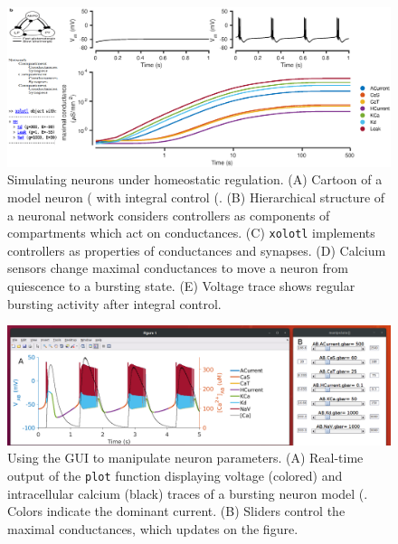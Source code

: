 \documentclass{frontiersSCNS} %
\begin{document}
\begin{figure}
	\centering
	\includegraphics[width=1.0\linewidth]{gfx/figure_integral_control}
	\caption{Simulating neurons under homeostatic regulation. (A) Cartoon of a model neuron (\cite{liuModelNeuronActivitydependent1998} with integral control (\cite{olearyCorrelationsIonChannel2013}. (B) Hierarchical structure of a neuronal network considers controllers as components of compartments which act on conductances. (C) \texttt{xolotl} implements controllers as properties of conductances and synapses. (D) Calcium sensors change maximal conductances to move a neuron from quiescence to a bursting state. (E) Voltage trace shows regular bursting activity after integral control.}
	\label{fig:figureintegralcontrol}
\end{figure}

\begin{figure}
	\centering
	\includegraphics[width=1.0\linewidth]{gfx/puppeteer_screenshot}
	\caption{Using the GUI to manipulate neuron parameters. (A) Real-time output of the \texttt{plot} function displaying voltage (colored) and intracellular calcium (black) traces of a bursting neuron model (\cite{prinzAlternativeHandtuningConductancebased2003, prinzSimilarNetworkActivity2004}. Colors indicate the dominant current. (B) Sliders control the maximal conductances, which updates on the figure.}
	\label{fig:puppeteerscreenshot}
\end{figure}
\end{document}
